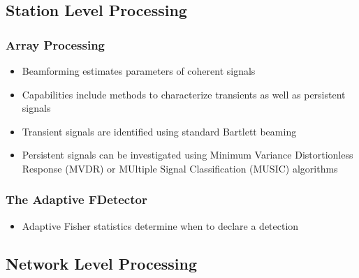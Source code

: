 \documentclass[letterpaper,10pt,english]{sphinxmanual}
\begin{document}
\subsection{Station Level Processing}
\label{\detokenize{algorithms:station-level-processing}}

\subsubsection{Array Processing}
\label{\detokenize{algorithms:beamforming}}\begin{itemize}
\item {} 
Beamforming estimates parameters of coherent signals

\item {} 
Capabilities include methods to characterize transients as well as persistent signals

\item {} 
Transient signals are identified using standard Bartlett beaming

\item {} 
Persistent signals can be investigated using Minimum Variance Distortionless Response (MVDR) or MUltiple Signal Classification (MUSIC) algorithms

\end{itemize}


\subsubsection{The Adaptive F\sphinxhyphen{}Detector}
\label{\detokenize{algorithms:afd}}\begin{itemize}
\item {} 
Adaptive Fisher statistics determine when to declare a detection

\end{itemize}


\subsection{Network Level Processing}
\label{\detokenize{algorithms:network-level-processing}}
\end{document}
